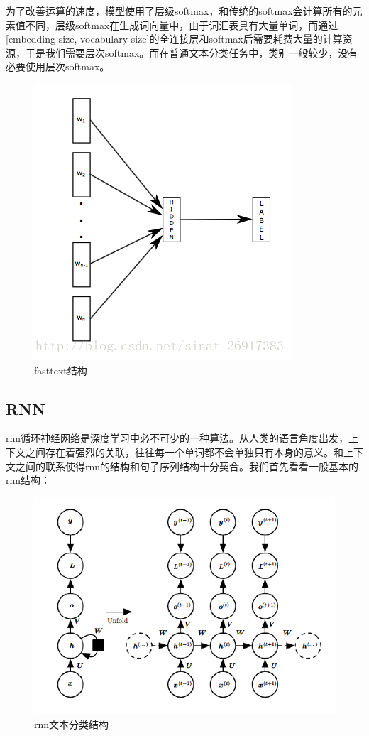 \documentclass{article}
\begin{document}
为了改善运算的速度，模型使用了层级softmax，和传统的softmax会计算所有的元素值不同，层级softmax在生成词向量中，由于词汇表具有大量单词，而通过[embedding size, vocabulary size]的全连接层和softmax后需要耗费大量的计算资源，于是我们需要层次softmax。而在普通文本分类任务中，类别一般较少，没有必要使用层次softmax。
\begin{figure}
  \centering
  \includegraphics[width=.8\textwidth]{fasttext.png} %
  \caption{fasttext结构}
  \label{fig:fig1}
\end{figure}




\subsection{RNN}

rnn循环神经网络是深度学习中必不可少的一种算法。从人类的语言角度出发，上下文之间存在着强烈的关联，往往每一个单词都不会单独只有本身的意义。和上下文之间的联系使得rnn的结构和句子序列结构十分契合。我们首先看看一般基本的rnn结构：

\begin{figure}
  \centering
  \includegraphics[width=.8\textwidth]{rnn.png} %
  \caption{rnn文本分类结构}
  \label{fig:fig1}
\end{figure}
\end{document}

